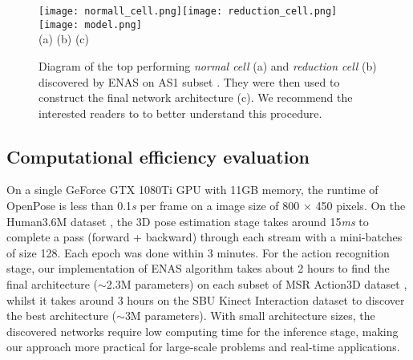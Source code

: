 \documentclass{bmvc2k}
\begin{document}
\begin{figure}[ht]
\begin{center}
\texttt{[image: normall\_cell.png]}\texttt{[image: reduction\_cell.png]} \hspace{0.1cm} \texttt{[image: model.png]}\\
\scriptsize{ \hspace*{2cm} (a) \hspace{5.2cm} (b) \hspace{3cm} (c)}
\vspace*{-0.5cm}
\end{center}
   \caption{Diagram of the top performing \textit{normal cell} (a) and \textit{reduction cell} (b) discovered by ENAS \cite{pmlr-v80-pham18a} on AS1 subset \cite{li2010action}. They were then used to construct the final network architecture (c). We recommend the interested readers to \cite{pmlr-v80-pham18a} to better understand this procedure.} 
\label{fig:6}
\end{figure} 
\subsection{Computational efficiency evaluation  \\[-0.1cm]} \label{sect:4.4}
On a single GeForce GTX 1080Ti GPU  with 11GB memory, the runtime of OpenPose \cite{cao2017realtime} is less than 0.1\textit{s} per frame on a image size of 800 $\times$ 450 pixels. On the Human3.6M dataset \cite{6682899}, the 3D pose estimation stage takes around 15\textit{ms} to complete a pass (forward + backward) through each stream with a mini-batches of size 128. Each epoch was done within 3 minutes. For the action recognition stage, our implementation of ENAS algorithm takes about 2 hours to find the final architecture ($\sim$2.3M parameters) on each subset of MSR Action3D dataset \cite{li2010action}, whilst it takes around 3 hours on the SBU Kinect Interaction dataset \cite{yun2012two} to discover the best architecture ($\sim$3M parameters). With small architecture sizes, the discovered networks require low computing time for the inference stage, making our approach more practical for large-scale problems and real-time applications. 
\end{document}
